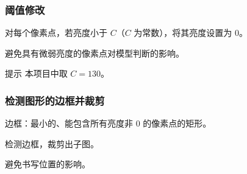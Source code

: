 \documentclass[10pt,aspectratio=43,serif]{beamer}
\begin{document}
\begin{frame}
    \frametitle{阈值修改}
    对每个像素点，若亮度小于 $C$（$C$ 为常数），将其亮度设置为 $0$。
    
    避免具有微弱亮度的像素点对模型判断的影响。
    
    \begin{exampleblock}{提示}
        本项目中取 $C = 130$。        
    \end{exampleblock}
    
    \begin{figure}
        \qquad
    \end{figure}
\end{frame}

\begin{frame}
    \frametitle{检测图形的边框并裁剪}
    边框：最小的、能包含所有亮度非 $0$ 的像素点的矩形。
    
    检测边框，裁剪出子图。
    
    避免书写位置的影响。
    
    \begin{figure}
        \qquad
    \end{figure}
\end{frame}
\end{document}
